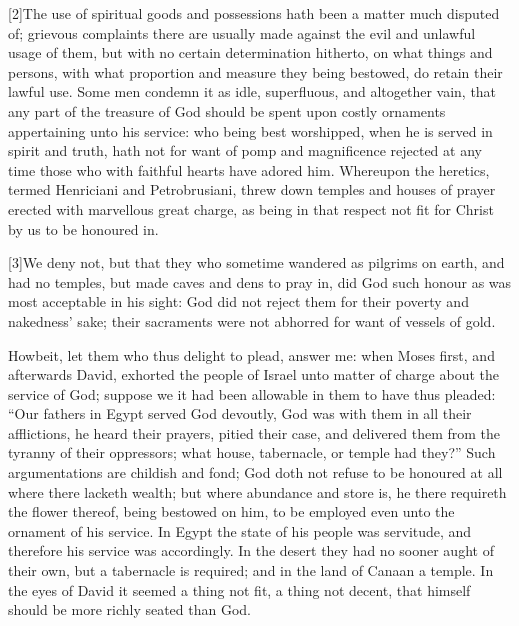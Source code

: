 [2]The use of spiritual goods and possessions hath been a matter much disputed of; grievous complaints there are usually made against the evil and unlawful usage of them, but  with no certain determination hitherto, on what things and persons, with what proportion and measure they being bestowed, do retain their lawful use. Some men condemn it as idle, superfluous, and altogether vain, that any part of the treasure of God should be spent upon costly ornaments appertaining unto his service: who being best worshipped, when he is served in spirit and truth, hath not for want of pomp and magnificence rejected at any time those who with faithful hearts have adored him. Whereupon the heretics, termed Henriciani and Petrobrusiani, threw down temples and houses of prayer erected with marvellous great charge, as being in that respect not fit for Christ by us to be honoured in.

[3]We deny not, but that they who sometime wandered as pilgrims on earth, and had no temples, but made caves and dens to pray in, did God such honour as was most acceptable in his sight: God did not reject them for their poverty and nakedness’ sake; their sacraments were not abhorred for want of vessels of gold.

Howbeit, let them who thus delight to plead, answer me: when Moses first, and afterwards David, exhorted the people of Israel unto matter of charge about the service of God; suppose we it had been allowable in them to have thus pleaded: “Our fathers in Egypt served God devoutly, God was with them in all their afflictions, he heard their prayers, pitied their case, and delivered them from the tyranny of their oppressors; what house, tabernacle, or temple had they?” Such argumentations are childish and fond; God doth not refuse to be honoured at all where there lacketh wealth; but where abundance and store is, he there requireth the flower thereof, being bestowed on him, to be employed even unto the ornament of his service. In Egypt the state of his people was servitude, and therefore his service was accordingly. In the desert they had no sooner aught of their own, but a tabernacle is required; and in the land of Canaan a temple. In the eyes of David it seemed a thing not fit, a thing not decent, that himself should be more richly seated than God.

